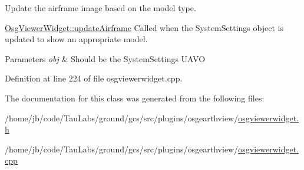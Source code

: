 \-Update the airframe image based on the model type. 

\hyperlink{class_osg_viewer_widget_adcfd8d4429bc27110d678b34bf88b695}{\-Osg\-Viewer\-Widget\-::update\-Airframe} \-Called when the \-System\-Settings object is updated to show an appropriate model.


\begin{DoxyParams}{\-Parameters}
{\em obj} & \-Should be the \-System\-Settings \-U\-A\-V\-O \\
\hline
\end{DoxyParams}


\-Definition at line 224 of file osgviewerwidget.\-cpp.



\-The documentation for this class was generated from the following files\-:\begin{DoxyCompactItemize}
\item 
/home/jb/code/\-Tau\-Labs/ground/gcs/src/plugins/osgearthview/\hyperlink{osgviewerwidget_8h}{osgviewerwidget.\-h}\item 
/home/jb/code/\-Tau\-Labs/ground/gcs/src/plugins/osgearthview/\hyperlink{osgviewerwidget_8cpp}{osgviewerwidget.\-cpp}\end{DoxyCompactItemize}
